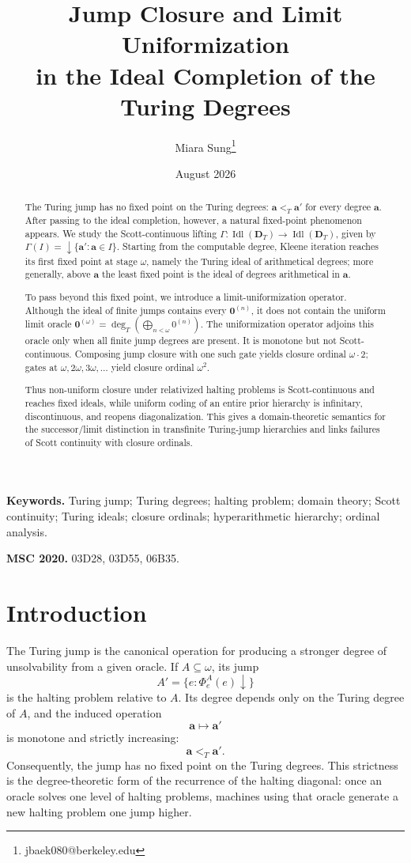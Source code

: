 \documentclass[11pt]{article}
\title{\textbf{Jump Closure and Limit Uniformization\\in the Ideal Completion of the Turing Degrees}}
\author{Miara Sung\thanks{jbaek080@berkeley.edu}}
\date{August 2026}
\theoremstyle{definition}
\theoremstyle{remark}
\newcommand{\ltT}{<_T}
\begin{document}
\maketitle

\begin{abstract}
The Turing jump has no fixed point on the Turing degrees: $\mathbf a <_T \mathbf a'$ for every degree $\mathbf a$. After passing to the ideal completion, however, a natural fixed-point phenomenon appears. We study the Scott-continuous lifting
$\Gamma:\operatorname{Idl}(\mathbf D_T)\to\operatorname{Idl}(\mathbf D_T)$,
given by
$\Gamma(I)=\downarrow\{\mathbf a':\mathbf a\in I\}$.
Starting from the computable degree, Kleene iteration reaches its first fixed point at stage $\omega$, namely the Turing ideal of arithmetical degrees; more generally, above $\mathbf a$ the least fixed point is the ideal of degrees arithmetical in $\mathbf a$.

To pass beyond this fixed point, we introduce a limit-uniformization operator. Although the ideal of finite jumps contains every $\mathbf 0^{(n)}$, it does not contain the uniform limit oracle
$\mathbf 0^{(\omega)}=\deg_T\!\left(\bigoplus_{n < \omega}0^{(n)}\right)$.
The uniformization operator adjoins this oracle only when all finite jump degrees are present. It is monotone but not Scott-continuous. Composing jump closure with one such gate yields closure ordinal $\omega\cdot 2$; gates at $\omega,2\omega,3\omega,\ldots$ yield closure ordinal $\omega^2$.

Thus non-uniform closure under relativized halting problems is Scott-continuous and reaches fixed ideals, while uniform coding of an entire prior hierarchy is infinitary, discontinuous, and reopens diagonalization. This gives a domain-theoretic semantics for the successor/limit distinction in transfinite Turing-jump hierarchies and links failures of Scott continuity with closure ordinals.
\end{abstract}

\noindent\textbf{Keywords.} Turing jump; Turing degrees; halting problem; domain theory; Scott continuity; Turing ideals; closure ordinals; hyperarithmetic hierarchy; ordinal analysis.

\medskip
\noindent\textbf{MSC 2020.} 03D28, 03D55, 06B35.

\section{Introduction}

The Turing jump is the canonical operation for producing a stronger degree of unsolvability from a given oracle. If $A\subseteq\omega$, its jump
\[
A'=\{e:\Phi_e^A(e)\downarrow\}
\]
is the halting problem relative to $A$. Its degree depends only on the Turing degree of $A$, and the induced operation
\[
\mathbf a\longmapsto\mathbf a'
\]
is monotone and strictly increasing:
\[
\mathbf a\ltT\mathbf a'.
\]
Consequently, the jump has no fixed point on the Turing degrees. This strictness is the degree-theoretic form of the recurrence of the halting diagonal: once an oracle solves one level of halting problems, machines using that oracle generate a new halting problem one jump higher.
\end{document}
